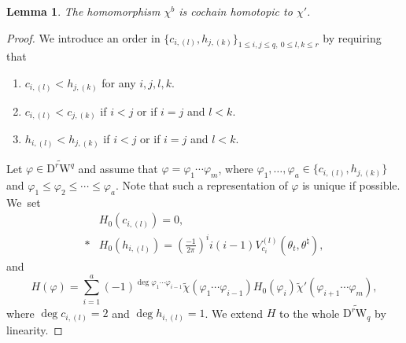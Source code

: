 \documentclass[12pt]{amsart}
\newcommand{\W}{\mathrm{W}}
\newcommand{\D}{\mathrm{D}}
\newtheorem{lemma}[theorem]{Lemma}
\theoremstyle{definition}
\theoremstyle{remark}
\begin{document}
\begin{lemma}
\label{lem7.4}
The homomorphism $\chi^b$ is cochain homotopic to $\chi'$.
\end{lemma}
\begin{proof}
We introduce an order in $\{c_{i,(l)},h_{j,(k)}\}_{1\leq i,j\leq q,\ 0\leq l,k\leq r}$ by requiring that
\begin{enumerate}
\item
$c_{i,(l)}<h_{j,(k)}$ for any $i,j,l,k$.
\item
$c_{i,(l)}<c_{j,(k)}$ if $i<j$ or if $i=j$ and $l<k$.
\item
$h_{i,(l)}<h_{j,(k)}$ if $i<j$ or if $i=j$ and $l<k$.
\end{enumerate}
Let $\varphi\in\widetilde{\D^r\W^q}$ and assume that $\varphi=\varphi_1\cdots\varphi_m$, where $\varphi_1,\ldots,\varphi_a\in\{c_{i,(l)},h_{j,(k)}\}$ and $\varphi_1\leq\varphi_2\leq\cdots\leq\varphi_a$.
Note that such a representation of $\varphi$ is unique if possible.
We~set
\begin{align*}
&H_0(c_{i,(l)})=0,\\*
&H_0(h_{i,(l)})=\left(\frac{-1}{2\pi}\right)^ii(i-1)V^{(l)}_{c_i}(\theta_t,\theta^\natural),
\end{align*}
and
\[
H(\varphi)=\sum_{i=1}^a(-1)^{\deg\varphi_1\cdots\varphi_{i-1}}\widetilde\chi(\varphi_1\cdots\varphi_{i-1})H_0(\varphi_i)\widetilde\chi'(\varphi_{i+1}\cdots\varphi_m),
\]
where $\deg c_{i,(l)}=2$ and $\deg h_{i,(l)}=1$.
We extend $H$ to the whole $\widetilde{\D^r\W_q}$ by linearity.


\end{proof}
\end{document}
